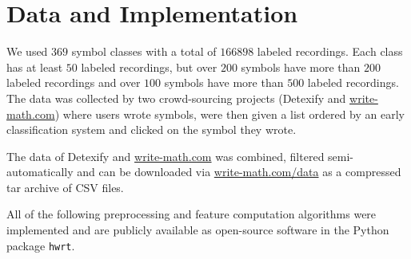 
\section{Data and Implementation}
We used $\num{369}$ symbol classes with a total of $\num{166898}$ labeled
recordings. Each class has at least $\num{50}$ labeled recordings, but over
$200$ symbols have more than $\num{200}$ labeled recordings and over $100$
symbols have more than $500$ labeled recordings.
The data was collected by two crowd-sourcing projects (Detexify and
\href{http://write-math.com}{write-math.com}) where users wrote
symbols, were then given a list ordered by an early classification system and
clicked on the symbol they wrote.

The data of Detexify and \href{http://write-math.com}{write-math.com} was
combined, filtered semi-automatically and can be downloaded via
\href{http://write-math.com/data}{write-math.com/data} as a compressed tar
archive of CSV files.

All of the following preprocessing and feature computation algorithms were
implemented and are publicly available as open-source software in the Python
package \texttt{hwrt}.

